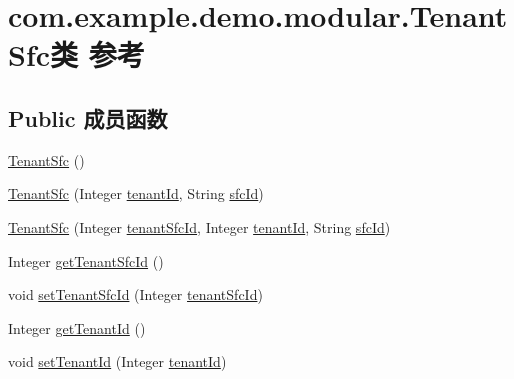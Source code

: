 \hypertarget{classcom_1_1example_1_1demo_1_1modular_1_1_tenant_sfc}{}\section{com.\+example.\+demo.\+modular.\+Tenant\+Sfc类 参考}
\label{classcom_1_1example_1_1demo_1_1modular_1_1_tenant_sfc}
\subsection*{Public 成员函数}
\begin{DoxyCompactItemize}
\item 
\mbox{\hyperlink{classcom_1_1example_1_1demo_1_1modular_1_1_tenant_sfc_a6cff64c6e12a0feb04c8b78891fbe3ee}{Tenant\+Sfc}} ()
\item 
\mbox{\hyperlink{classcom_1_1example_1_1demo_1_1modular_1_1_tenant_sfc_a54ec9a5eb201c43e50b47e3ee5b7e505}{Tenant\+Sfc}} (Integer \mbox{\hyperlink{classcom_1_1example_1_1demo_1_1modular_1_1_tenant_sfc_ab6b926216037da5939301551fd2623f2}{tenant\+Id}}, String \mbox{\hyperlink{classcom_1_1example_1_1demo_1_1modular_1_1_tenant_sfc_a53f057c5be72cd08f00da203f79ce570}{sfc\+Id}})
\item 
\mbox{\hyperlink{classcom_1_1example_1_1demo_1_1modular_1_1_tenant_sfc_af40b3cd0a01343960cca188b5e61b94c}{Tenant\+Sfc}} (Integer \mbox{\hyperlink{classcom_1_1example_1_1demo_1_1modular_1_1_tenant_sfc_a13f42212db191895a4b8f0b460950901}{tenant\+Sfc\+Id}}, Integer \mbox{\hyperlink{classcom_1_1example_1_1demo_1_1modular_1_1_tenant_sfc_ab6b926216037da5939301551fd2623f2}{tenant\+Id}}, String \mbox{\hyperlink{classcom_1_1example_1_1demo_1_1modular_1_1_tenant_sfc_a53f057c5be72cd08f00da203f79ce570}{sfc\+Id}})
\item 
Integer \mbox{\hyperlink{classcom_1_1example_1_1demo_1_1modular_1_1_tenant_sfc_a14848b95e50675cab2413a630853336c}{get\+Tenant\+Sfc\+Id}} ()
\item 
void \mbox{\hyperlink{classcom_1_1example_1_1demo_1_1modular_1_1_tenant_sfc_a6a1f8a2b5d27e0532de0a16cad087b11}{set\+Tenant\+Sfc\+Id}} (Integer \mbox{\hyperlink{classcom_1_1example_1_1demo_1_1modular_1_1_tenant_sfc_a13f42212db191895a4b8f0b460950901}{tenant\+Sfc\+Id}})
\item 
Integer \mbox{\hyperlink{classcom_1_1example_1_1demo_1_1modular_1_1_tenant_sfc_a95e847d203f9e24d175d0299b8c2dccf}{get\+Tenant\+Id}} ()
\item 
void \mbox{\hyperlink{classcom_1_1example_1_1demo_1_1modular_1_1_tenant_sfc_a07b52a6aa40289db320f1ea206e2b149}{set\+Tenant\+Id}} (Integer \mbox{\hyperlink{classcom_1_1example_1_1demo_1_1modular_1_1_tenant_sfc_ab6b926216037da5939301551fd2623f2}{tenant\+Id}})

\end{DoxyCompactItemize}
